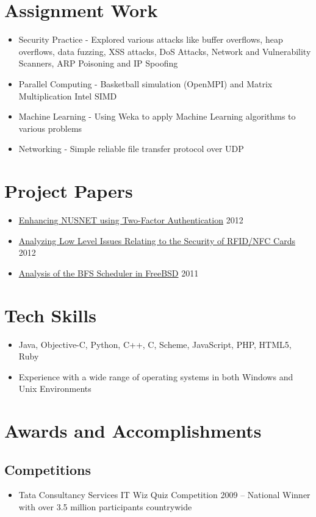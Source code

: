 \documentclass[11pt,a4paper]{moderncv}
\begin{document}
\section{Assignment Work}
{\begin{itemize}
 \item Security Practice - Explored various attacks like buffer overflows,
     heap overflows, data fuzzing, XSS attacks, DoS Attacks, Network and Vulnerability Scanners,
     ARP Poisoning and IP Spoofing
 \item Parallel Computing - Basketball simulation (OpenMPI) and Matrix Multiplication Intel SIMD
 \item Machine Learning - Using Weka to apply Machine Learning algorithms to various problems
 \item Networking - Simple reliable file transfer protocol over UDP
 \end{itemize}}
\section{Project Papers}
\begin{itemize}
\item \href{https://github.com/vellvisher/papers_reports/raw/master/NUS_2FA_GA.pdf}{Enhancing NUSNET using Two-Factor Authentication} \hfill 2012
\item \href{https://github.com/vellvisher/papers_reports/raw/master/RFID_NFC.pdf}{Analyzing Low Level Issues Relating to the Security of RFID/NFC Cards} \hfill 2012
\item \href{https://github.com/vellvisher/papers_reports/raw/master/BFS_FreeBSD.pdf}{Analysis of the BFS Scheduler in FreeBSD} \hfill 2011
\end{itemize}
\section{Tech Skills}
\begin{itemize}
\item Java, Objective-C, Python, C++, C, Scheme, JavaScript, PHP, HTML5, Ruby
\item Experience with a wide range of operating systems in both Windows and Unix Environments
\end{itemize}
\section{Awards and Accomplishments}
\subsection{Competitions}
\begin{itemize}
\item Tata Consultancy Services IT Wiz Quiz Competition 2009 – National Winner with over 3.5
million participants countrywide
\end{itemize}
\end{document}
